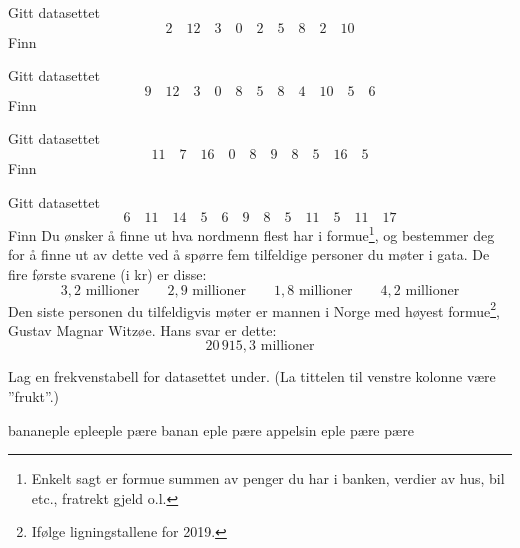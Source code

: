 



\opgt

\nes

Gitt datasettet
\[ 2\quad12\quad 3\quad 0\quad 2\quad 5\quad 8\quad2\quad 10 \]
Finn \os
{}

Gitt datasettet
	\[ 9\quad12\quad 3\quad 0\quad 8\quad 5\quad 8\quad4\quad 10\quad 5 \quad 6 \]
Finn \os
{}

Gitt datasettet
\[ 11\quad7\quad 16\quad 0\quad 8\quad 9\quad 8\quad5\quad 16\quad 5 \]
Finn \os
{}

Gitt datasettet
\[ 6\quad11\quad 14\quad 5\quad 6\quad 9\quad 8\quad5\quad 11\quad 5\quad 11\quad 17 \]
Finn \os
{}
\newpage
{}
Du ønsker å finne ut hva nordmenn flest har i formue\footnote{Enkelt sagt er formue summen av penger du har i banken, verdier av hus, bil etc., fratrekt gjeld o.l.}, og bestemmer deg for å finne ut av dette ved å spørre fem tilfeldige personer du møter i gata. De fire første svarene (i kr) er disse:
\[ 3,2\text{ millioner}\qquad 2,9\text{ millioner}\qquad 1,8\text{ millioner}\qquad 4,2\text{ millioner}  \]
Den siste personen du tilfeldigvis møter er mannen i Norge med høyest formue\footnote{Ifølge ligningstallene for 2019.}, Gustav Magnar Witzøe. Hans svar er dette:
\[ 20\,915,3\text{ millioner} \]

Lag en frekvenstabell for datasettet under. (La tittelen til venstre kolonne være ''frukt''.)
\begin{center}
	banan\quad eple \quad eple\quad eple \quad pære \quad banan \quad eple \quad pære \quad appelsin \quad eple \quad pære \quad pære
\end{center}

